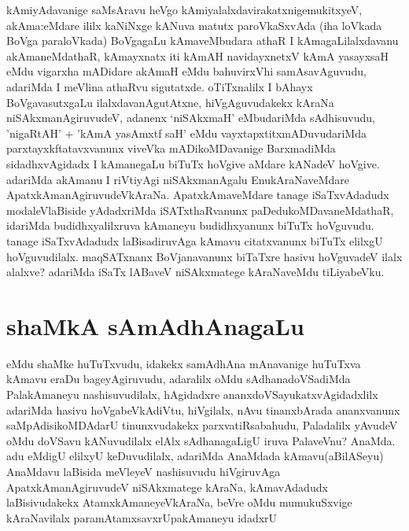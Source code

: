\begin{artha}
kAmiyAdavanige saMsAravu heVgo kAmiyalalxdavirakatxnige\break mukitxyeV, akAma:eMdare ililx kaNiNxge kANuva matutx paroVkaSxvAda (iha loVkada BoVga paraloVkada) BoVgagaLu kAmaveMbudara athaR I kAmagaLilalxdavanu akAmaneMdathaR, kAmayxnatx iti kAmAH navidayxnetxV kAmA yasayxsaH eMdu vigarxha mADidare akAmaH eMdu bahuvirxVhi samAsavAguvudu, adariMda I meVlina athaRvu sigutatxde. oTiTxnalilx I bAhayx BoVgavasutxgaLu ilalxdavanAgutAtxne, hiVgAguvudakekx kAraNa niSAkxmanAgiruvudeV, adanenx `niSAkxmaH' eMbudariMda sAdhisuvudu, 'nigaRtAH' + 'kAmA yasAmxtf saH' eMdu vayxtapxtitxmADuvudariMda parxtayxkftatavxvanunx viveVka mADikoMDavanige BarxmadiMda sidadhxvAgidadx I kAmanegaLu biTuTx hoVgive aMdare kANadeV hoVgive. adariMda akAmanu I riVtiyAgi niSAkxmanAgalu EnukAraNaveMdare ApatxkAmanAgiruvudeVkAraNa. ApatxkAmaveMdare tanage iSaTxvAdadudx modaleVlaBiside yAdadxriMda iSATxthaRvanunx paDedukoMDavaneMdathaR, idariMda budidhxyalilxruva kAmaneyu budidhxyanunx biTuTx hoVguvudu. tanage iSaTxvAdadudx laBisadiruvAga kAmavu citatxvanunx biTuTx elilxgU hoVguvudilalx. maqSATxnanx BoVjanavanunx biTaTxre hasivu hoVguvadeV ilalx alalxve? adariMda iSaTx lABaveV niSAkxmatege kAraNaveMdu tiLiyabeVku.
\end{artha}

\section*{shaMkA sAmAdhAnagaLu}


\begin{artha}
eMdu shaMke huTuTxvudu, idakekx samAdhAna mAnavanige huTuTxva kAmavu eraDu bageyAgiruvudu, adaralilx oMdu sAdhanadoVSadiMda PalakAmaneyu nashisuvudilalx, hAgidadxre ananxdoVSayukatxvAgidadxlilx adariMda hasivu hoVgabeVkAdiVtu, hiVgilalx, nAvu tinanxbArada ananxvanunx saMpAdisikoMDAdarU tinunxvudakekx parxvatiRsabahudu, Paladalilx yAvudeV oMdu doVSavu kANuvudilalx elAlx sAdhanagaLigU iruva PalaveVnu? AnaMda. adu eMdigU elilxyU keDuvudilalx, adariMda AnaMdada kAmavu(aBilASeyu) AnaMdavu laBisida meVleyeV nashisuvudu hiVgiruvAga ApatxkAmanAgiruvudeV niSAkxmatege kAraNa, kAmavAdadudx laBisivudakekx AtamxkAmaneyeVkAraNa, beVre oMdu mumukuSxvige kAraNavilalx paramAtamxsavxrUpakAmaneyu idadxrU  
\end{artha}

